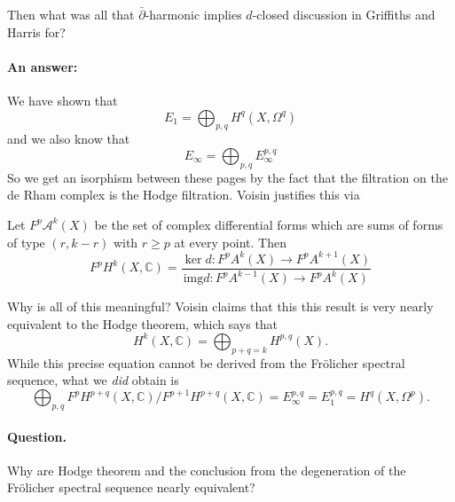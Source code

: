 \begin{remark}
\label{remark-dani}
	Then what was all that
	$\bar\partial$-harmonic implies $d$-closed
	discussion in Griffiths and Harris for?
\end{remark}

\paragraph{An answer:} We have shown that
$$E_1=\bigoplus_{p,q} H^{q}(X,\Omega^q)$$
and we also know that
$$E_{\infty}=\bigoplus_{p,q} E_{\infty}^{p,q} $$
So we get an isorphism between these pages by
the fact that the filtration on the de Rham
complex is the Hodge filtration. Voisin
justifies this via
\begin{proposition}[Voisin, 7.5]
\label{proposition-voisin-7-5}
Let $F^p\mathcal{A}^k(X)$ be the set of
complex differential forms which are sums of
forms of type $(r,k-r)$ with $r\geq p$ at
every point. Then
$$F^pH^{k}(X,\mathbb{C})=\dfrac{\ker
d:F^pA^k(X)\to F^pA^{k+1}(X) }{\text{img
}d:F^pA^{k-1}(X)\to F^pA^k(X)}$$
\end{proposition}

\begin{remark}
\label{remark-why-all-meani-voisi-claim}
	Why is all of this meaningful? Voisin claims
	that this this result is very nearly
	equivalent to the Hodge theorem, which says
	that
\begin{equation*}\label{eq:hodge-decom}
	 H^{k}(X,\mathbb{C})=\bigoplus_{p+q=k}
	 H^{p,q}(X).
\end{equation*}
While this precise equation cannot be derived
from the Fr\"olicher spectral sequence, what
we \textit{did} obtain is
$$\bigoplus_{p,q}F^pH^{p+q}(X,\mathbb{C})/
F^{p+1}H^{p+q}(X,\mathbb{C})=E^{p,q}_{\infty}
=E^{p,q}_{1}=H^q(X,\Omega^p).$$

\paragraph{Question.}
Why are Hodge theorem and the conclusion from
the degeneration of the Fr\"olicher spectral
sequence nearly equivalent?
\end{remark}








